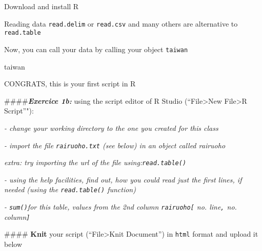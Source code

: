 \documentclass[
  ignorenonframetext,
]{beamer}
\newenvironment{Shaded}{\begin{snugshade}}{\end{snugshade}}
\newcommand{\NormalTok}[1]{#1}
\begin{document}
\begin{frame}[fragile]{Download and install R}
\begin{block}{Reading data}
{\texttt{read.delim}} {or} {\texttt{read.csv}} { and many others are
alternative to} {\texttt{read.table}}

{Now, you can call your data by calling your object} {\texttt{taiwan}}

\begin{Shaded}
\begin{Highlighting}[]
\NormalTok{taiwan}
\end{Highlighting}
\end{Shaded}

{CONGRATS, this is your first script in R}

\#\#\#\#\textbf{\emph{{Exercice 1b:}}} {using the script editor of R
Studio (``File\textgreater New File\textgreater R Script''"):}

\begin{block}{\emph{{- change your working directory to the one you
created for this class}}}

\end{block}

\begin{block}{\emph{{- import the file {\texttt{rairuoho.txt}} (see
below) in an object called rairuoho }}}

\emph{extra: try importing the url of the file
using:{\texttt{read.table()}}}

\end{block}

\begin{block}{\emph{{- using the help facilities, find out, how you
could read just the first lines, if needed (using the
{\texttt{read.table()}} function) }}}

\end{block}

\begin{block}{\emph{{- {\texttt{sum()}}for this table, values from the
2nd column {\texttt{rairuoho}}{\texttt{{[}}} no. line{\texttt{,}} no.
column{\texttt{{]}}} }}}

\#\#\#\#{ \textbf{Knit} your script (``File\textgreater Knit Document'')
in {\texttt{html}} format and upload it below}

\end{block}

\end{block}

\end{frame}
\end{document}
